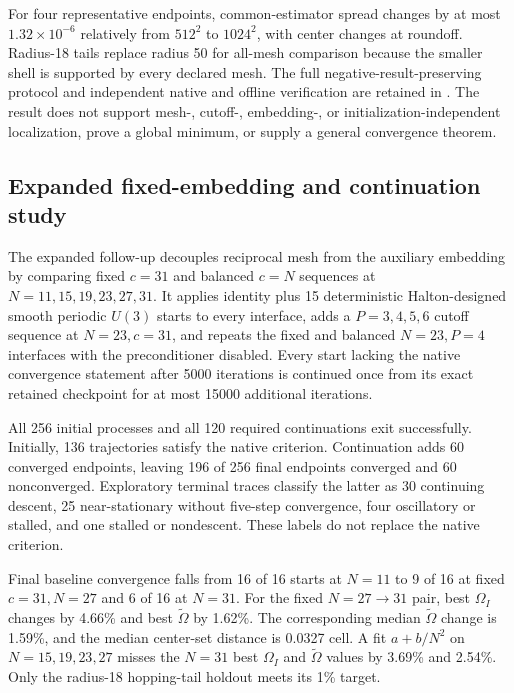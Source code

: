 For four representative endpoints, common-estimator spread changes by at most
$1.32\times10^{-6}$ relatively from $512^2$ to $1024^2$, with center changes
at roundoff. Radius-18 tails replace radius 50 for all-mesh comparison because
the smaller shell is supported by every declared mesh. The full
negative-result-preserving protocol and independent native and offline
verification are retained in
. The result
does not support mesh-, cutoff-, embedding-, or initialization-independent
localization, prove a global minimum, or supply a general convergence theorem.

\subsection{Expanded fixed-embedding and continuation study}

The expanded follow-up decouples reciprocal mesh from the auxiliary
embedding by comparing fixed $c=31$ and balanced $c=N$ sequences at
$N=11,15,19,23,27,31$. It applies identity plus 15 deterministic
Halton-designed smooth periodic $U(3)$ starts to every interface, adds a
$P=3,4,5,6$ cutoff sequence at $N=23,c=31$, and repeats the fixed and balanced
$N=23,P=4$ interfaces with the preconditioner disabled. Every start lacking the
native convergence statement after 5000 iterations is continued once from its
exact retained checkpoint for at most 15000 additional iterations.

All 256 initial processes and all 120 required continuations exit successfully.
Initially, 136 trajectories satisfy the native criterion. Continuation adds 60
converged endpoints, leaving 196 of 256 final endpoints converged and 60
nonconverged. Exploratory terminal traces classify the latter as 30 continuing
descent, 25 near-stationary without five-step convergence, four oscillatory or
stalled, and one stalled or nondescent. These labels do not replace the native
criterion.

Final baseline convergence falls from 16 of 16 starts at $N=11$ to 9 of 16 at
fixed $c=31,N=27$ and 6 of 16 at $N=31$. For the fixed $N=27\to31$ pair,
best $\Omega_I$ changes by 4.66\% and best $\widetilde\Omega$ by 1.62\%.
The corresponding median $\widetilde\Omega$ change is 1.59\%, and the median
center-set distance is 0.0327 cell. A fit $a+b/N^2$ on
$N=15,19,23,27$ misses the $N=31$ best $\Omega_I$ and
$\widetilde\Omega$ values by 3.69\% and 2.54\%. Only the radius-18 hopping-tail
holdout meets its 1\% target.

